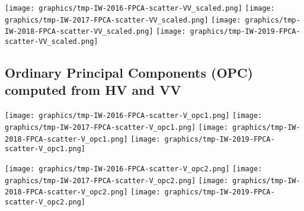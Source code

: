 
\clearpage
\begin{center}
\begin{minipage}{7.0in}
\texttt{[image: graphics/tmp-IW-2016-FPCA-scatter-VV\_scaled.png]}
\quad
\texttt{[image: graphics/tmp-IW-2017-FPCA-scatter-VV\_scaled.png]}
\vskip 1.0cm
\texttt{[image: graphics/tmp-IW-2018-FPCA-scatter-VV\_scaled.png]}
\quad
\texttt{[image: graphics/tmp-IW-2019-FPCA-scatter-VV\_scaled.png]}
\end{minipage}
\end{center}


\clearpage

\subsection{Ordinary Principal Components (OPC) computed from HV and VV}
\label{FPCA-scatter-opc}

\begin{center}
\begin{minipage}{7.0in}
\texttt{[image: graphics/tmp-IW-2016-FPCA-scatter-V\_opc1.png]}
\quad
\texttt{[image: graphics/tmp-IW-2017-FPCA-scatter-V\_opc1.png]}
\vskip 1.0cm
\texttt{[image: graphics/tmp-IW-2018-FPCA-scatter-V\_opc1.png]}
\quad
\texttt{[image: graphics/tmp-IW-2019-FPCA-scatter-V\_opc1.png]}
\end{minipage}
\end{center}


\clearpage
\begin{center}
\begin{minipage}{7.0in}
\texttt{[image: graphics/tmp-IW-2016-FPCA-scatter-V\_opc2.png]}
\quad
\texttt{[image: graphics/tmp-IW-2017-FPCA-scatter-V\_opc2.png]}
\vskip 1.0cm
\texttt{[image: graphics/tmp-IW-2018-FPCA-scatter-V\_opc2.png]}
\quad
\texttt{[image: graphics/tmp-IW-2019-FPCA-scatter-V\_opc2.png]}
\end{minipage}
\end{center}


\clearpage

